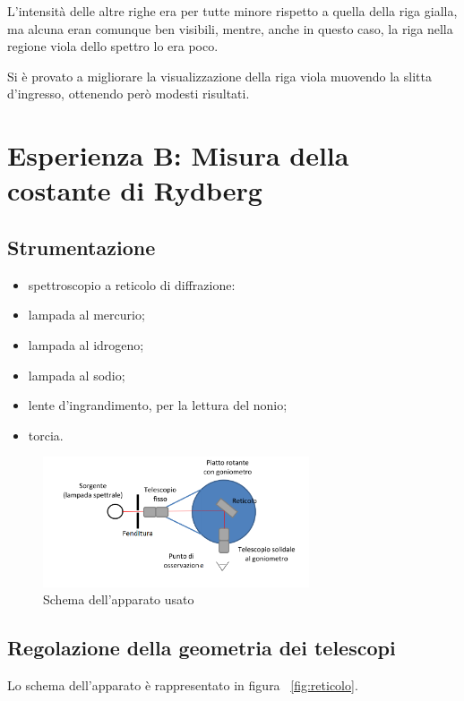 \documentclass[a4paper,10pt]{article}
\begin{document}
{{{{{{L'intensità delle altre righe era per tutte minore rispetto a quella della riga gialla, ma alcuna eran comunque ben visibili, mentre, anche in questo caso, la riga nella regione viola dello spettro lo era poco.

Si è provato a migliorare la visualizzazione della riga viola muovendo la slitta d'ingresso, ottenendo però modesti risultati.

\section{Esperienza B: Misura della costante di Rydberg}

\subsection{Strumentazione}

\begin{itemize}
	\item spettroscopio a reticolo di diffrazione:

	\item lampada al mercurio;
	\item lampada al idrogeno;
	\item lampada al sodio;
	\item lente d'ingrandimento, per la lettura del nonio;
	\item torcia.
\end{itemize}

\begin{figure}[H]
	\centering
	\includegraphics[width=0.7\textwidth]{../grafici/Schema2.png}
	\caption{Schema dell'apparato usato}
	\label{fig:schema2}
\end{figure}

\subsection{Regolazione della geometria dei telescopi}
Lo schema dell'apparato è rappresentato in figura \figurename{~\ref{fig:reticolo}}.

}}}}}}
\end{document}
